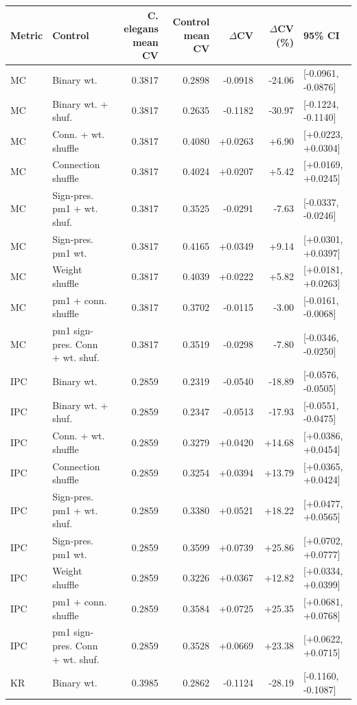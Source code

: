 \begin{tabular}{llrrrrl}
\toprule
Metric & Control & C. elegans mean CV & Control mean CV & $\Delta$CV & $\Delta$CV (\%) & 95\% CI \\
\midrule
MC & Binary wt. & 0.3817 & 0.2898 & -0.0918 & -24.06 & [-0.0961, -0.0876] \\
MC & Binary wt. + shuf. & 0.3817 & 0.2635 & -0.1182 & -30.97 & [-0.1224, -0.1140] \\
MC & Conn. + wt. shuffle & 0.3817 & 0.4080 & +0.0263 & +6.90 & [+0.0223, +0.0304] \\
MC & Connection shuffle & 0.3817 & 0.4024 & +0.0207 & +5.42 & [+0.0169, +0.0245] \\
MC & Sign-pres. pm1 + wt. shuf. & 0.3817 & 0.3525 & -0.0291 & -7.63 & [-0.0337, -0.0246] \\
MC & Sign-pres. pm1 wt. & 0.3817 & 0.4165 & +0.0349 & +9.14 & [+0.0301, +0.0397] \\
MC & Weight shuffle & 0.3817 & 0.4039 & +0.0222 & +5.82 & [+0.0181, +0.0263] \\
MC & pm1 + conn. shuffle & 0.3817 & 0.3702 & -0.0115 & -3.00 & [-0.0161, -0.0068] \\
MC & pm1 sign-pres. Conn + wt. shuf. & 0.3817 & 0.3519 & -0.0298 & -7.80 & [-0.0346, -0.0250] \\
IPC & Binary wt. & 0.2859 & 0.2319 & -0.0540 & -18.89 & [-0.0576, -0.0505] \\
IPC & Binary wt. + shuf. & 0.2859 & 0.2347 & -0.0513 & -17.93 & [-0.0551, -0.0475] \\
IPC & Conn. + wt. shuffle & 0.2859 & 0.3279 & +0.0420 & +14.68 & [+0.0386, +0.0454] \\
IPC & Connection shuffle & 0.2859 & 0.3254 & +0.0394 & +13.79 & [+0.0365, +0.0424] \\
IPC & Sign-pres. pm1 + wt. shuf. & 0.2859 & 0.3380 & +0.0521 & +18.22 & [+0.0477, +0.0565] \\
IPC & Sign-pres. pm1 wt. & 0.2859 & 0.3599 & +0.0739 & +25.86 & [+0.0702, +0.0777] \\
IPC & Weight shuffle & 0.2859 & 0.3226 & +0.0367 & +12.82 & [+0.0334, +0.0399] \\
IPC & pm1 + conn. shuffle & 0.2859 & 0.3584 & +0.0725 & +25.35 & [+0.0681, +0.0768] \\
IPC & pm1 sign-pres. Conn + wt. shuf. & 0.2859 & 0.3528 & +0.0669 & +23.38 & [+0.0622, +0.0715] \\
KR & Binary wt. & 0.3985 & 0.2862 & -0.1124 & -28.19 & [-0.1160, -0.1087] \\

\end{tabular}

